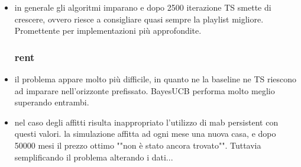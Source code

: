 \begin{itemize}
	\item in generale gli algoritmi imparano e dopo 2500 iterazione TS smette di crescere, ovvero riesce a consigliare quasi sempre la playlist migliore. Promettente per implementazioni più approfondite.
	
	\subsubsection{rent}
	\item il problema appare molto più difficile, in quanto ne la baseline ne TS riescono ad imparare nell'orizzonte prefissato. BayesUCB performa molto meglio superando entrambi.
	
	\item nel caso degli affitti risulta inappropriato l'utilizzo di mab persistent con questi valori. la simulazione affitta ad ogni mese una nuova casa, e dopo 50000 mesi il prezzo ottimo ""non è stato ancora trovato"". Tuttavia semplificando il problema alterando i dati...
	
	
	
		
	
\end{itemize}
